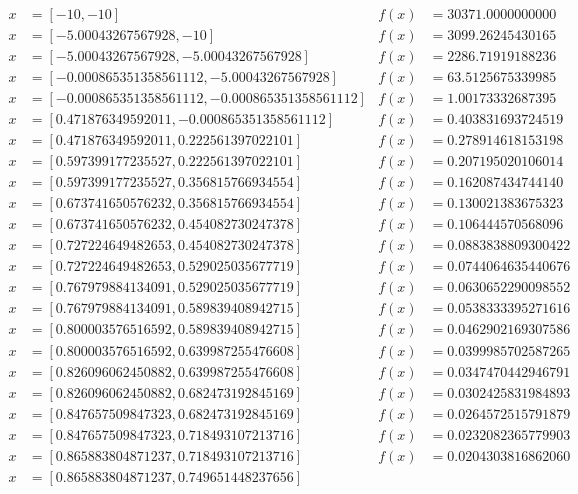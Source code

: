 \documentclass[a4paper,12pt]{article}
\begin{document}
\begin{align*}
x &= [-10, -10] & 
f(x) &= 30371.0000000000 \\
x &= [-5.00043267567928, -10] & 
f(x) &= 3099.26245430165 \\
x &= [-5.00043267567928, -5.00043267567928] & 
f(x) &= 2286.71919188236 \\
x &= [-0.000865351358561112, -5.00043267567928] & 
f(x) &= 63.5125675339985 \\
x &= [-0.000865351358561112, -0.000865351358561112] & 
f(x) &= 1.00173332687395 \\
x &= [0.471876349592011, -0.000865351358561112] & 
f(x) &= 0.403831693724519 \\
x &= [0.471876349592011, 0.222561397022101] & 
f(x) &= 0.278914618153198 \\
x &= [0.597399177235527, 0.222561397022101] & 
f(x) &= 0.207195020106014 \\
x &= [0.597399177235527, 0.356815766934554] & 
f(x) &= 0.162087434744140 \\
x &= [0.673741650576232, 0.356815766934554] & 
f(x) &= 0.130021383675323 \\
x &= [0.673741650576232, 0.454082730247378] & 
f(x) &= 0.106444570568096 \\
x &= [0.727224649482653, 0.454082730247378] & 
f(x) &= 0.0883838809300422 \\
x &= [0.727224649482653, 0.529025035677719] & 
f(x) &= 0.0744064635440676 \\
x &= [0.767979884134091, 0.529025035677719] & 
f(x) &= 0.0630652290098552 \\
x &= [0.767979884134091, 0.589839408942715] & 
f(x) &= 0.0538333395271616 \\
x &= [0.800003576516592, 0.589839408942715] & 
f(x) &= 0.0462902169307586 \\
x &= [0.800003576516592, 0.639987255476608] & 
f(x) &= 0.0399985702587265 \\
x &= [0.826096062450882, 0.639987255476608] & 
f(x) &= 0.0347470442946791 \\
x &= [0.826096062450882, 0.682473192845169] & 
f(x) &= 0.0302425831984893 \\
x &= [0.847657509847323, 0.682473192845169] & 
f(x) &= 0.0264572515791879 \\
x &= [0.847657509847323, 0.718493107213716] & 
f(x) &= 0.0232082365779903 \\
x &= [0.865883804871237, 0.718493107213716] & 
f(x) &= 0.0204303816862060 \\
x &= [0.865883804871237, 0.749651448237656] & 

\end{align*}
\end{document}
